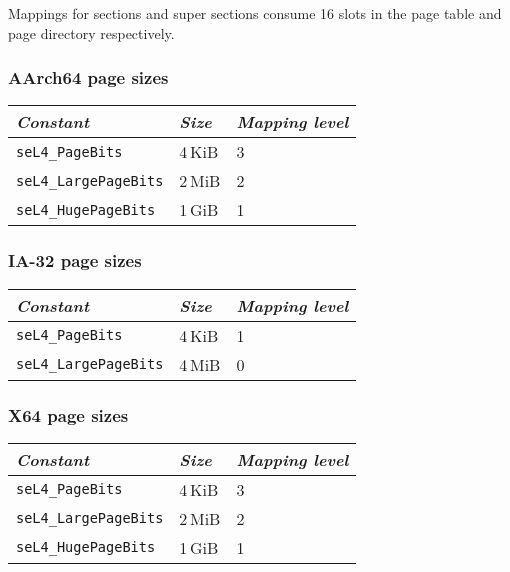 Mappings for sections and super sections consume 16 slots in the page table and page directory
respectively.

\subsubsection{AArch64 page sizes}

\begin{tabularx}{\textwidth}{Xll} \toprule
    \emph{Constant}             & \emph{Size} & \emph{Mapping level} \\ \midrule
    \texttt{seL4\_PageBits}      & 4\,KiB      & 3                   \\
    \texttt{seL4\_LargePageBits} & 2\,MiB     & 2                    \\
    \texttt{seL4\_HugePageBits}  & 1\,GiB     & 1                    \\
    \bottomrule
\end{tabularx}

\subsubsection{IA-32 page sizes}

\begin{tabularx}{\textwidth}{Xll} \toprule
    \emph{Constant}             & \emph{Size} & \emph{Mapping level} \\ \midrule
    \texttt{seL4\_PageBits}      & 4\,KiB      & 1                   \\
    \texttt{seL4\_LargePageBits} & 4\,MiB      & 0                   \\
    \bottomrule
\end{tabularx}

\subsubsection{X64 page sizes}

\begin{tabularx}{\textwidth}{Xll} \toprule
    \emph{Constant}             & \emph{Size} & \emph{Mapping level} \\ \midrule
    \texttt{seL4\_PageBits}      & 4\,KiB      & 3                   \\
    \texttt{seL4\_LargePageBits} & 2\,MiB      & 2                   \\
    \texttt{seL4\_HugePageBits}  & 1\,GiB      & 1                   \\
    \bottomrule
\end{tabularx}

